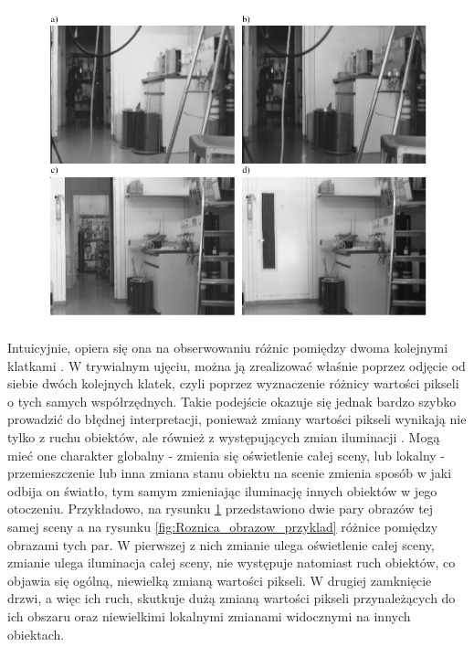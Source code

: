 \begin{figure}[!htb]
	\begin{center}
		\includegraphics[width=12cm]{images/motion_illumination_change_example.png}
	\end{center}	
\label{fig:Zmiany_w_sekwencji_przyklad}
\end{figure}

Intuicyjnie, opiera się ona na obserwowaniu różnic pomiędzy dwoma kolejnymi klatkami \cite{Jaehne2005}. W trywialnym ujęciu, można ją zrealizować właśnie poprzez odjęcie od siebie dwóch kolejnych klatek, czyli poprzez wyznaczenie różnicy wartości pikseli o tych samych współrzędnych. Takie podejście okazuje się jednak bardzo szybko prowadzić do błędnej interpretacji, ponieważ zmiany wartości pikseli wynikają nie tylko z ruchu obiektów, ale również z występujących zmian iluminacji \cite{Jaehne2005}. Mogą mieć one charakter globalny - zmienia się oświetlenie całej sceny, lub lokalny - przemieszczenie lub inna zmiana stanu obiektu na scenie zmienia sposób w jaki odbija on światło, tym samym zmieniając iluminację innych obiektów w jego otoczeniu. Przykładowo, na rysunku \ref{fig:Zmiany_w_sekwencji_przyklad} przedstawiono dwie pary obrazów tej samej sceny a na rysunku \ref{fig:Roznica_obrazow_przyklad} różnice pomiędzy obrazami tych par. W pierwszej z nich zmianie ulega oświetlenie całej sceny, zmianie ulega iluminacja całej sceny, nie występuje natomiast ruch obiektów, co objawia się ogólną, niewielką zmianą wartości pikseli. W drugiej zamknięcie drzwi, a więc ich ruch, skutkuje dużą zmianą wartości pikseli przynależących do ich obszaru oraz niewielkimi lokalnymi zmianami widocznymi na innych obiektach.

